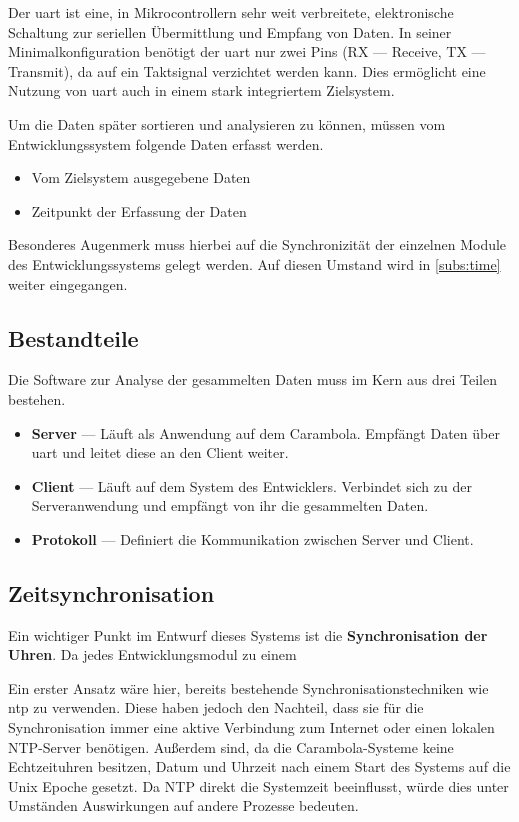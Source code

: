 \begin{definition}[UART]
Der \gls{uart} ist eine, in Mikrocontrollern sehr weit verbreitete,
elektronische Schaltung zur seriellen Übermittlung und Empfang von Daten. In
seiner Minimalkonfiguration benötigt der \gls{uart} nur zwei Pins (RX ---
Receive, TX --- Transmit), da auf ein Taktsignal verzichtet werden kann. Dies
ermöglicht eine Nutzung von \gls{uart} auch in einem stark integriertem
Zielsystem.
\end{definition}

Um die Daten später sortieren und analysieren zu können, müssen vom
Entwicklungssystem folgende Daten erfasst werden.
\begin{itemize}
  \item Vom Zielsystem ausgegebene Daten
  \item Zeitpunkt der Erfassung der Daten
\end{itemize}
Besonderes Augenmerk muss hierbei auf die Synchronizität der einzelnen Module
des Entwicklungssystems gelegt werden. Auf diesen Umstand wird in
\autoref{subs:time} weiter eingegangen. 

\subsection{Bestandteile}
Die Software zur Analyse der gesammelten Daten muss im Kern aus drei Teilen
bestehen.
\begin{itemize}
  \item \textbf{Server} --- Läuft als Anwendung auf dem Carambola. Empfängt
  Daten über \gls{uart} und leitet diese an den Client weiter.
  \item \textbf{Client} --- Läuft auf dem System des Entwicklers. Verbindet sich
  zu der Serveranwendung und empfängt von ihr die gesammelten Daten.
  \item \textbf{Protokoll} --- Definiert die Kommunikation zwischen Server und
  Client.
\end{itemize}

\subsection{Zeitsynchronisation}\label{subs:time}
Ein wichtiger Punkt im Entwurf dieses Systems ist die \textbf{Synchronisation
der Uhren}. Da jedes Entwicklungsmodul zu einem

Ein erster Ansatz wäre hier, bereits bestehende Synchronisationstechniken wie
\gls{ntp} zu verwenden. Diese haben jedoch den Nachteil, dass sie für die
Synchronisation immer eine aktive Verbindung zum Internet oder einen lokalen
NTP-Server  benötigen. Außerdem sind, da die Carambola-Systeme keine
Echtzeituhren besitzen, Datum und Uhrzeit nach einem Start des Systems auf die
Unix Epoche gesetzt. Da NTP direkt die Systemzeit beeinflusst, würde dies 
unter Umständen Auswirkungen auf andere Prozesse bedeuten.

